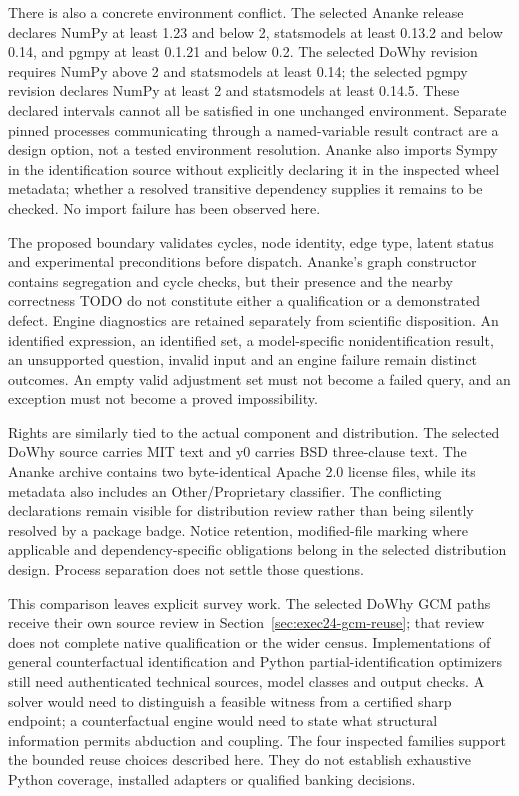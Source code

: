 There is also a concrete environment conflict. The selected Ananke release
declares NumPy at least 1.23 and below 2, statsmodels at least 0.13.2 and below 0.14,
and pgmpy at least 0.1.21 and below 0.2. The selected DoWhy revision requires
NumPy above 2 and statsmodels at least 0.14; the selected pgmpy revision declares
NumPy at least 2 and statsmodels at least 0.14.5. These declared intervals cannot
all be satisfied in one unchanged environment. Separate pinned processes
communicating through a named-variable result contract are a design option,
not a tested environment resolution. Ananke also imports Sympy in the
identification source without explicitly declaring it in the inspected wheel
metadata; whether a resolved transitive dependency supplies it remains to be
checked. No import failure has been observed here.
\citep{exec18_pyid_metadata,exec18_pyid_one_line,exec13_dowhy_project,exec13_pgmpy_reuse_primary}

The proposed boundary validates cycles, node identity, edge type, latent status
and experimental preconditions before dispatch. Ananke's graph constructor
contains segregation and cycle checks, but their presence and the nearby
correctness TODO do not constitute either a qualification or a demonstrated
defect. Engine diagnostics are retained separately from scientific disposition.
An identified expression, an identified set, a model-specific nonidentification
result, an unsupported question, invalid input and an engine failure remain
distinct outcomes. An empty valid adjustment set must not become a failed query,
and an exception must not become a proved impossibility.
\citep{exec18_pyid_graph,exec18_pyid_one_line,exec18_pyid_contract}

Rights are similarly tied to the actual component and distribution. The
selected DoWhy source carries MIT text and y0 carries BSD three-clause text.
The Ananke archive contains two byte-identical Apache 2.0 license files, while
its metadata also includes an Other/Proprietary classifier. The conflicting
declarations remain visible for distribution review rather than being silently
resolved by a package badge. Notice retention, modified-file marking where
applicable and dependency-specific obligations belong in the selected
distribution design. Process separation does not settle those questions.
\citep{exec13_dowhy_license,exec13_y0_license,exec18_pyid_license,exec18_pyid_metadata}

This comparison leaves explicit survey work. The selected DoWhy GCM paths
receive their own source review in Section~\ref{sec:exec24-gcm-reuse}; that
review does not complete native qualification or the wider census.
Implementations of general counterfactual identification and Python
partial-identification optimizers still need authenticated technical
sources, model classes and output checks. A solver would need to distinguish
a feasible witness from a certified sharp endpoint; a counterfactual engine
would need to state what structural information permits abduction and coupling.
The four inspected families support the bounded reuse choices described here.
They do not establish exhaustive Python coverage, installed adapters or
qualified banking decisions.~\citep{exec18_pyid_contract}


